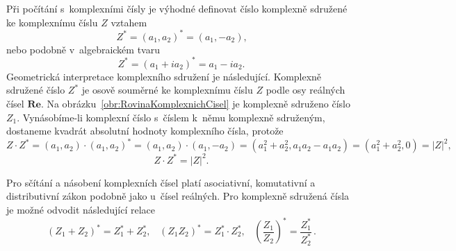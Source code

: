 Při počítání s~komplexními čísly je výhodné definovat číslo komplexně sdružené ke komplexnímu číslu $Z$ vztahem
\begin{equation}
Z^\ast = (a_1, a_2)^\ast = (a_1, -a_2) \mbox{,}
\label{rov:KomplexSdruzCislo-uspdvoj}
\end{equation}
nebo podobně v~algebraickém tvaru
\begin{equation}
Z^\ast = (a_1 + ia_2)^\ast = a_1 - ia_2 \mbox{.}
\end{equation}
Geometrická interpretace komplexního sdružení je následující. Komplexně sdružené číslo $Z^\ast$ je osově souměrné ke komplexnímu číslu $Z$ podle osy reálných čísel $\mathbf{Re}$. Na obrázku~\ref{obr:RovinaKomplexnichCisel} je komplexně sdruženo číslo $Z_1$. Vynásobíme-li komplexní číslo s~číslem k~němu komplexně sdruženým, dostaneme kvadrát absolutní hodnoty komplexního čísla, protože
\begin{displaymath}
Z \cdot Z^\ast = (a_1, a_2) \cdot (a_1, a_2)^\ast = (a_1, a_2) \cdot (a_1, -a_2) = (a_1^2 + a_2^2, a_1a_2 - a_1a_2) = (a_1^2 + a_2^2, 0) = |Z|^2 \mbox{,}
\end{displaymath}
\begin{equation}
Z \cdot Z^\ast = |Z|^2 \mbox{.}
\label{rov:KvadradAbsolutniHodnoty}
\end{equation}

Pro sčítání a násobení komplexních čísel platí asociativní, komutativní a distributivní zákon podobně jako u~čísel reálných. Pro komplexně sdružená čísla je možné odvodit následující relace
\begin{equation}
(Z_1 + Z_2)^\ast = Z_1^\ast + Z_2^\ast \mbox{,} \quad (Z_1Z_2)^\ast = Z_1^\ast \cdot Z_2^\ast \mbox{,} \quad \left(\frac{Z_1}{Z_2}\right)^\ast = \frac{Z_1^\ast}{Z_2^\ast} \,\mbox{.}
\label{rov:OperaceSdruzCisla}
\end{equation}


